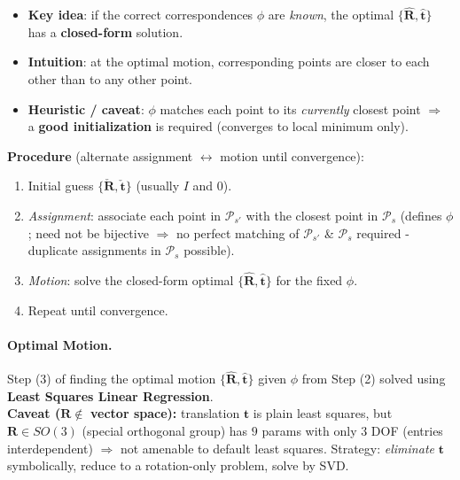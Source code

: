 \documentclass{article}
\begin{document}
\begin{itemize}
    \item \textbf{Key idea}: if the correct correspondences $\phi$ are \textit{known}, the optimal $\{\hat{\mathbf{R}}, \hat{\mathbf{t}}\}$ has a \textbf{closed-form} solution.
    \item \textbf{Intuition}: at the optimal motion, corresponding points are closer to each other than to any other point.
    \item \textbf{Heuristic / caveat}: $\phi$ matches each point to its \textit{currently} closest point $\Rightarrow$ a \textbf{good initialization} is required (converges to local minimum only).
\end{itemize}
\textbf{Procedure} (alternate assignment $\leftrightarrow$ motion until convergence):
\begin{enumerate}
    \item Initial guess $\{\check{\mathbf{R}}, \check{\mathbf{t}}\}$ (usually $I$ and $0$).
    \item \textit{Assignment}: associate each point in $\mathcal{P}_{s'}$ with the closest point in $\mathcal{P}_s$ (defines $\phi$; need not be bijective $\Rightarrow$ no perfect matching of $\mathcal{P}_{s'}$ \& $\mathcal{P}_s$ required - duplicate assignments in $\mathcal{P}_s$ possible).
    \item \textit{Motion}: solve the closed-form optimal $\{\hat{\mathbf{R}}, \hat{\mathbf{t}}\}$ for the fixed $\phi$.
    \item Repeat until convergence.
\end{enumerate}

\paragraph{Optimal Motion.}
Step (3) of finding the optimal motion $\{\hat{\mathbf{R}}, \hat{\mathbf{t}}\}$ given $\phi$ from Step (2) solved using \textbf{Least Squares Linear Regression}.\\

\textbf{Caveat (}$\mathbf{R}\notin$\textbf{ vector space):} translation $\mathbf{t}$ is plain least squares, but $\mathbf{R}\in SO(3)$ (special orthogonal group) has $9$ params with only $3$ DOF (entries interdependent) $\Rightarrow$ not amenable to default least squares. Strategy: \textit{eliminate} $\mathbf{t}$ symbolically, reduce to a rotation-only problem, solve by SVD.\\
\end{document}
